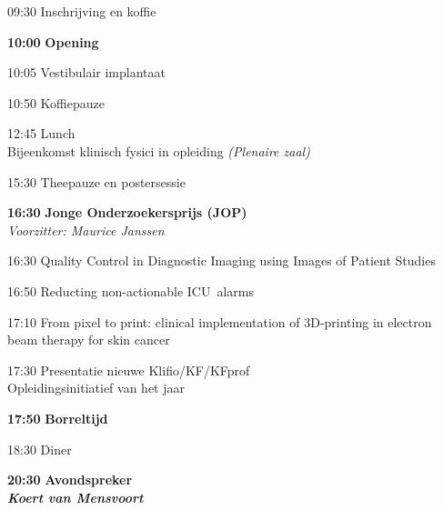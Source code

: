 \documentclass[a4paper,10pt]{report}
\begin{document}
\begin{multicols*}{3}
\begin{packed_enum}
    \item[09:30] Inschrijving en koffie
        \vfill
    \item[\textbf{10:00}] \textbf{Opening}
        \vfill
    \item[10:05] Vestibulair implantaat
        \vfill
    \item[10:50] Koffiepauze
        \vfill
    \item[{\color{Blue}{\textbf{11:20}}}]{ }
        \vfill
    \item[12:45] Lunch\\
        {\small Bijeenkomst klinisch fysici in opleiding \hfill\textit{(Plenaire zaal)}}
        \vfill
    \item[{\color{Blue}{\textbf{14:00}}}]{ }
        \vfill
    \item[15:30] Theepauze en postersessie 
        \vfill
    \item[\textbf{16:30}] {\textbf{Jonge Onderzoekersprijs (JOP)}}\\\textit{Voorzitter: Maurice Janssen}
    \item[16:30] Quality Control in Diagnostic Imaging using Images of Patient Studies
    \item[16:50] Reducting non-actionable ICU alarms
    \item[17:10] From pixel to print: clinical implementation of 3D-printing in electron beam therapy for skin cancer
        \vfill
    \item[17:30] Presentatie nieuwe Klifio/KF/KFprof\\Opleidingsinitiatief van het jaar
        \vfill
    \item[\textbf{17:50}] {\textbf{Borreltijd}}
        \vfill
    \item[18:30] Diner
        \vfill
    \item[\textbf{20:30}] {\textbf{Avondspreker}}\\\textbf{\textit{Koert van Mensvoort}}
    \end{packed_enum}%



\end{multicols*}
\end{document}
